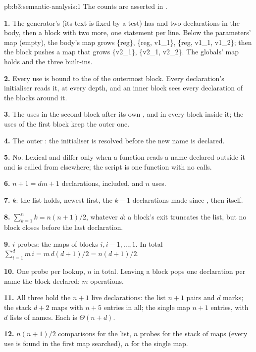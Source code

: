 \begin{solution}{pb:b3:semantic-analysis:1}
The counts are asserted in .

\textbf{1.} The generator's  (its text is fixed by a test) has  and two declarations in the body, then a block with two more, one statement per line. Below the parameters' map (empty), the body's map grows \{reg\}, \{reg, v1\_1\}, \{reg, v1\_1, v1\_2\}; then the block pushes a map that grows \{v2\_1\}, \{v2\_1, v2\_2\}. The globals' map holds  and the three built-ins.

\textbf{2.} Every use is bound to the  of the outermost block. Every declaration's initialiser reads it, at every depth, and an inner block sees every declaration of the blocks around it.

\textbf{3.} The uses in the second block after its own , and in every block inside it; the uses of the first block keep the outer one.

\textbf{4.} The outer : the initialiser is resolved before the new name is declared.

\textbf{5.} No. Lexical and  differ only when a function reads a name declared outside it and is called from elsewhere; the script is one function with no calls.

\textbf{6.} $n + 1 = dm + 1$ declarations,  included, and $n$ uses.

\textbf{7.} $k$: the list holds, newest first, the $k - 1$ declarations made since , then  itself.

\textbf{8.} $\sum_{k=1}^{n} k = n(n+1)/2$, whatever $d$: a block's exit truncates the list, but no block closes before the last declaration.

\textbf{9.} $i$ probes: the maps of blocks $i, i - 1, \dots, 1$. In total $\sum_{i=1}^{d} m\,i = m\,d(d+1)/2 = n(d+1)/2$.

\textbf{10.} One probe per lookup, $n$ in total. Leaving a block pops one declaration per name the block declared: $m$ operations.

\textbf{11.} All three hold the $n + 1$ live declarations: the list $n + 1$ pairs and $d$ marks; the stack $d + 2$ maps with $n + 5$ entries in all; the single map $n + 1$ entries, with $d$ lists of names. Each is $\Theta(n + d)$.

\textbf{12.} $n(n+1)/2$ comparisons for the list, $n$ probes for the stack of maps (every use is found in the first map searched), $n$ for the single map.


\end{solution}
